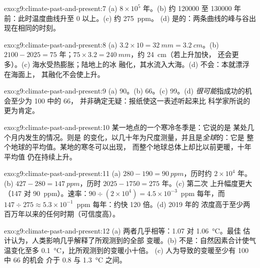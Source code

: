 \begin{solution}{exo:g9:climate-past-and-present:7}
(a) $8 \times 10^5$ 年。(b) 约 \num{120000} 至 \num{130000} 年
前：此时温度曲线升至 0 以上。(c) 约 \qty{275}{ppm}。
(d) 是的：两条曲线的峰与谷出现在相同的时刻。
\end{solution}

\begin{solution}{exo:g9:climate-past-and-present:8}
(a) $3.2 \times 10 = \qty{32}{mm} = \qty{3.2}{cm}$。(b) $2100 - 2025 =
75$ 年；$75 \times 3.2 = \qty{240}{mm}$，约 \qty{24}{cm}（若上升加快，
还会更多）。(c) 海水受热膨胀；陆地上的冰
融化，其水流入大海。(d) 不会：本就漂浮在海面上，
其融化不会使上升。
\end{solution}

\begin{solution}{exo:g9:climate-past-and-present:9}
(a) 90。(b) 66。(c) 99。(d) \emph{很可能}指成功的机会至少为 100 中的 66，
并非确定无疑：报纸使这一表述听起来比
科学家所说的更为肯定。
\end{solution}

\begin{solution}{exo:g9:climate-past-and-present:10}
某一地点的一个寒冷冬季是\emph{}：它说的是
某处几个月内发生的情况。则是
\emph{}的变化，以几十年为尺度测量，并且是\emph{全球}的：它是
整个地球的平均值。某地的寒冬可以出现，
而整个地球总体上却比以前更暖，十年平均值
仍在持续上升。
\end{solution}

\begin{solution}{exo:g9:climate-past-and-present:11}
(a) $280 - 190 = \qty{90}{ppm}$，历时约 $2 \times 10^4$ 年。(b) $427
- 280 = \qty{147}{ppm}$，历时 $2025 - 1750 = 275$ 年。(c) 第二次
上升幅度更大（147 对 90~ppm）。速率：$90 \div (2 \times 10^4) =
4.5 \times 10^{-3}$~ppm 每年，而 $147 \div 275 \approx 5.3 \times
10^{-1}$~ppm 每年：约快 120 倍。(d) 2019 年的
浓度高于至少两百万年以来的任何时期（可信度高）。
\end{solution}

\begin{solution}{exo:g9:climate-past-and-present:12}
(a) 两者几乎相等：1.07 对 \qty{1.06}{\degreeCelsius}。最佳
估计认为，人类影响几乎解释了所观测到的全部
变暖。(b) 不是：自然因素合计使气温变化至多
\qty{0.1}{\degreeCelsius}，比所观测到的变暖小十倍。
(c) 人为导致的变暖至少有 100 中 66 的机会
介于 0.8 与 \qty{1.3}{\degreeCelsius} 之间。
\end{solution}

